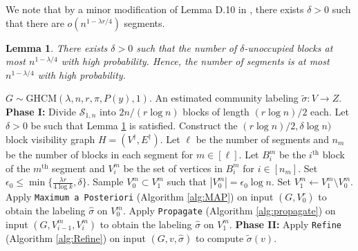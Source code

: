 \documentclass{article}
\newcommand{\1}{\mathbbm{1}}
\newcommand{\calS}{\mathcal{S}}
\theoremstyle{definition}
\theoremstyle{plain}
\newtheorem{lemma}{Lemma}
\begin{document}
We note that by a minor modification of Lemma D.10 in \cite{Gaudio+2025}, there exists $\delta > 0$ such that there are $o(n^{1 - \lambda r/4})$ segments.
\begin{lemma}
\label{lem:max_initial_blocks_1d}
    There exists $\delta > 0$ such that the number of $\delta$-unoccupied blocks at most $n^{1-\lambda/4}$ with high probability. Hence, the number of segments is at most $n^{1-\lambda/4}$ with high probability.
\end{lemma}

\begin{algorithm}
\caption{Exact Recovery for $d = 1, |\Omega_{\pi, P}| = 1$}
\label{alg:exact_recovery_1d}
\begin{algorithmic}[1]
    \Require $G \sim \text{GHCM}(\lambda, n, r, \pi, P(y), 1)$.
    \Ensure An estimated community labeling $\tilde{\sigma}: V \to Z$.
    \State \textbf{Phase I:}
    \State Divide $\calS_{1, n}$ into $2n/(r \log n)$ blocks of length $(r \log n) /2$ each. \label{line:create_blocks_1d}
    \State Let $\delta > 0$ be such that Lemma \ref{lem:max_initial_blocks_1d} is satisfied. 
    \State Construct the $(r \log n)/2, \delta \log n)$ block visibility graph $H = (V^\dagger, E^\dagger)$. Let $\ell$ be the number of segments and $n_m$ be the number of blocks in each segment for $m \in [\ell]$. Let $B_i^m$ be the $i^\text{th}$ block of the $m^\text{th}$ segment and $V_i^m$ be the set of vertices in  $B_i^m$ for $i \in [n_m]$.
    \State Set $\epsilon_0 \leq \min\{\frac{\lambda r}{4 \log k}, \delta\}$.
        \State Sample $V_0^m \subset V_1^m$ such that $|V_0^m| = \epsilon_0 \log n$. Set $V_1^m \gets V_1^m \setminus V_0^m$.
        \State Apply \texttt{Maximum a Posteriori} (Algorithm \ref{alg:MAP}) on input $(G, V_0^r)$ to obtain the labeling $\hat{\sigma}$ on $V_0^m$.
            \State Apply \texttt{Propagate} (Algorithm \ref{alg:propagate}) on input $(G, V_{i-1}^m, V_i^m)$ to obtain the labeling $\hat{\sigma}$ on $V_1^m$.
        \EndFor
    \EndFor
    \State \textbf{Phase II:}
        \State Apply \texttt{Refine} (Algorithm \ref{alg:Refine}) on input $(G, v, \hat{\sigma})$ to compute $\tilde{\sigma}(v)$.
    \EndFor
\end{algorithmic}
\end{algorithm}
\end{document}
